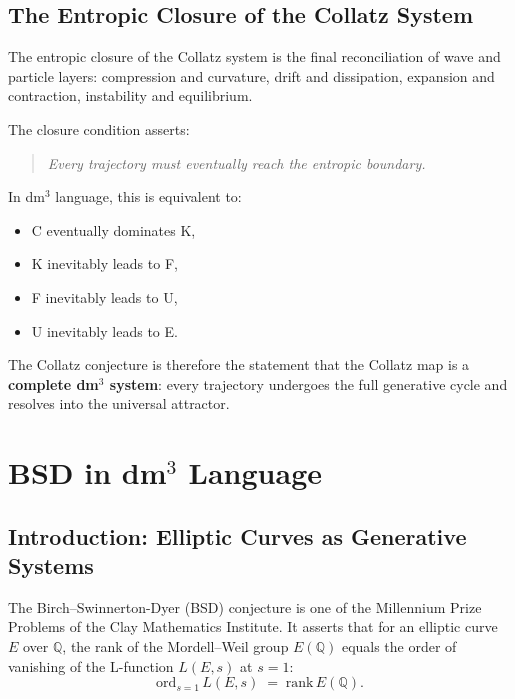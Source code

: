 \documentclass[14pt, twoside, openright]{book}
\theoremstyle{definition}
\theoremstyle{remark}
\newenvironment{structuralclaim}{%
  \begin{quote}\itshape}{\end{quote}}
\begin{document}
\section{The Entropic Closure of the Collatz System}

The entropic closure of the Collatz system is the final reconciliation of wave
and particle layers: compression and curvature, drift and dissipation, expansion
and contraction, instability and equilibrium.

\medskip
\noindent The closure condition asserts:

\begin{structuralclaim}
Every trajectory must eventually reach the entropic boundary.
\end{structuralclaim}

\noindent In dm$^{3}$ language, this is equivalent to:

\begin{itemize}[leftmargin=2em]
  \item C eventually dominates K,
  \item K inevitably leads to F,
  \item F inevitably leads to U,
  \item U inevitably leads to E.
\end{itemize}

The Collatz conjecture is therefore the statement that the Collatz map is a
\textbf{complete dm$^{3}$ system}: every trajectory undergoes the full generative
cycle and resolves into the universal attractor.

\chapter{BSD in \texorpdfstring{dm$^{3}$}{dm3} Language}

\section{Introduction: Elliptic Curves as Generative Systems}

The Birch--Swinnerton-Dyer (BSD) conjecture is one of the Millennium Prize
Problems of the Clay Mathematics Institute. It asserts that for an elliptic curve
$E$ over $\mathbb{Q}$, the rank of the Mordell--Weil group $E(\mathbb{Q})$ equals
the order of vanishing of the L-function $L(E,s)$ at $s = 1$:
\[
  \mathrm{ord}_{s=1}\, L(E,s) \;=\; \mathrm{rank}\, E(\mathbb{Q}).
\]
\end{document}
